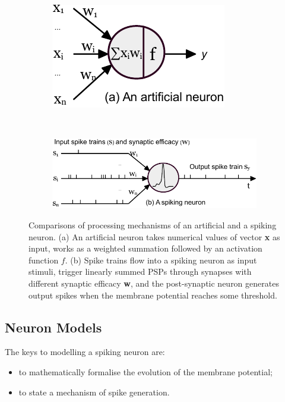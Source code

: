 	\begin{figure}[tb!]
		\centering
		\begin{subfigure}[t]{0.28\textwidth}
			\includegraphics[width=\textwidth]{pics_snn/neuron_ann.pdf}
		\end{subfigure}~
		\begin{subfigure}[t]{0.65\textwidth}
			\includegraphics[width=\textwidth]{pics_snn/neuron_snn.pdf}
		\end{subfigure}
		\caption[Comparisons of an artificial and a spiking neuron.]{Comparisons of processing mechanisms of an artificial and a spiking neuron. (a) An artificial neuron takes numerical values of vector \textbf{x} as input, works as a weighted summation followed by an activation function $f$. (b) Spike trains flow into a spiking neuron as input stimuli, trigger linearly summed PSPs through synapses with different synaptic efficacy \textbf{w}, and the post-synaptic neuron generates output spikes when the membrane potential reaches some threshold.}
		\label{Fig:compare_as}
	\end{figure}

\subsection{Neuron Models}
\label{subsec:neuron_model}
The keys to modelling a spiking neuron are: 
\begin{itemize}
	\item to mathematically formalise the evolution of the membrane potential;
	\item to state a mechanism of spike generation.
\end{itemize}

